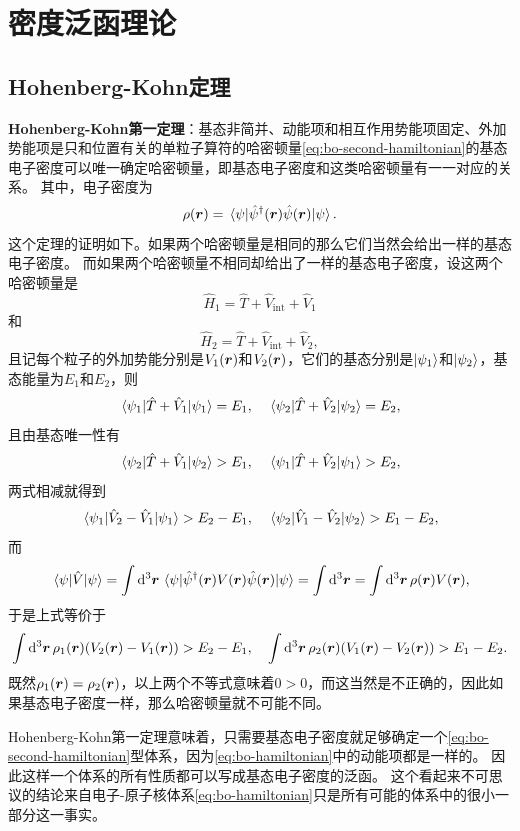 \documentclass[hyperref, UTF8, a4paper]{ctexart}
\begin{document}
\section{密度泛函理论}

\subsection{Hohenberg-Kohn定理}

\textbf{Hohenberg-Kohn第一定理}：基态非简并、动能项和相互作用势能项固定、外加势能项是只和位置有关的单粒子算符的哈密顿量\eqref{eq:bo-second-hamiltonian}的基态电子密度可以唯一确定哈密顿量，即基态电子密度和这类哈密顿量有一一对应的关系。
其中，电子密度为
\begin{equation}
    \rho(\vb*{r}) = \mel{\psi}{\hat{\psi}^\dagger(\vb*{r}) \hat{\psi}(\vb*{r})}{\psi}.
\end{equation}
这个定理的证明如下。如果两个哈密顿量是相同的那么它们当然会给出一样的基态电子密度。
而如果两个哈密顿量不相同却给出了一样的基态电子密度，设这两个哈密顿量是
\[
    \hat{H}_1 = \hat{T} + \hat{V}_\text{int} + \hat{V}_1
\]
和
\[
    \hat{H}_2 = \hat{T} + \hat{V}_\text{int} + \hat{V}_2,
\]
且记每个粒子的外加势能分别是$V_1(\vb*{r})$和$V_2(\vb*{r})$，它们的基态分别是$\ket{\psi_1}$和$\ket{\psi_2}$，基态能量为$E_1$和$E_2$，则
\[
    \mel{\psi_1}{\hat{T} + \hat{V}_1}{\psi_1} = E_1, \quad \mel{\psi_2}{\hat{T} + \hat{V}_2}{\psi_2} = E_2,
\]
且由基态唯一性有
\[
    \mel{\psi_2}{\hat{T} + \hat{V}_1}{\psi_2} > E_1, \quad \mel{\psi_1}{\hat{T} + \hat{V}_2}{\psi_1} > E_2,
\]
两式相减就得到
\[
    \mel{\psi_1}{\hat{V}_2 - \hat{V}_1}{\psi_1} > E_2 - E_1, \quad \mel{\psi_2}{\hat{V}_1 - \hat{V}_2}{\psi_2} > E_1 - E_2,
\]
而
\[
    \mel{\psi}{\hat{V}}{\psi} = \int \dd[3]{\vb*{r}} \mel{\psi}{\hat{\psi}^\dagger(\vb*{r}) V(\vb*{r}) \hat{\psi}(\vb*{r})}{\psi} = \int \dd[3]{\vb*{r}} = \int \dd[3]{\vb*{r}} \rho(\vb*{r}) V(\vb*{r}),
\]
于是上式等价于
\[
    \int \dd[3]{\vb*{r}} \rho_1(\vb*{r}) (V_2(\vb*{r}) - V_1(\vb*{r})) > E_2 - E_1, \quad \int \dd[3]{\vb*{r}} \rho_2(\vb*{r}) (V_1(\vb*{r}) - V_2(\vb*{r})) > E_1 - E_2.
\]
既然$\rho_1(\vb*{r}) = \rho_2(\vb*{r})$，以上两个不等式意味着$0 > 0$，而这当然是不正确的，因此如果基态电子密度一样，那么哈密顿量就不可能不同。

Hohenberg-Kohn第一定理意味着，只需要基态电子密度就足够确定一个\eqref{eq:bo-second-hamiltonian}型体系，因为\eqref{eq:bo-hamiltonian}中的动能项都是一样的。
因此这样一个体系的所有性质都可以写成基态电子密度的泛函。
这个看起来不可思议的结论来自电子-原子核体系\eqref{eq:bo-hamiltonian}只是所有可能的体系中的很小一部分这一事实。
\end{document}
